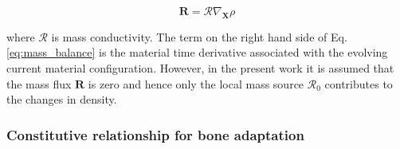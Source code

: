 \documentclass[review]{elsarticle}
\numberwithin{equation}{section}
\begin{document}
\begin{equation}
\mathbf{R} = \mathcal{R} \nabla_\mathbf{X} \rho
\label{eq:mass_flux}
\end{equation}

where $\mathcal{R}$ is mass conductivity. The term on the right hand side of Eq. \ref{eq:mass_balance}
is the material time derivative associated with the evolving current material
configuration. 
However, in the present work it is assumed that the mass flux $\mathbf{R}$ is zero and hence only the local mass source $\mathcal{R}_0$ contributes to the changes in density.


\subsubsection{Constitutive relationship for bone adaptation}

\label{sec:constitutive_eq}
\end{document}
